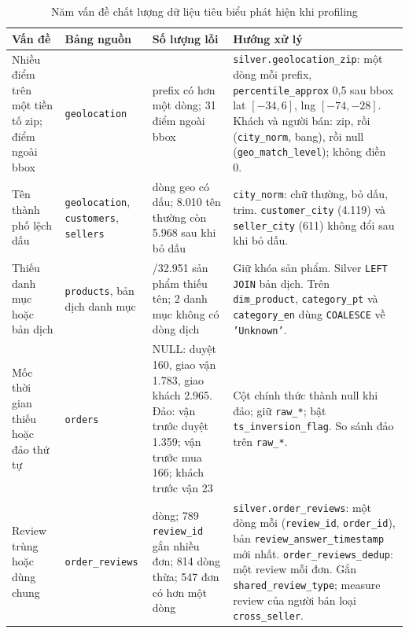 \documentclass[a4paper]{article}
\begin{document}
\begin{table}[htbp]
\centering
\footnotesize
\setlength{\tabcolsep}{3pt}
\renewcommand{\arraystretch}{1.08}
\caption{Năm vấn đề chất lượng dữ liệu tiêu biểu phát hiện khi profiling}
\label{tab:profiling_issues}
\begin{tabularx}{\textwidth}{@{}>{\raggedright\arraybackslash}p{2.5cm}>{\raggedright\arraybackslash}p{2.35cm}>{\raggedright\arraybackslash}p{3.15cm}>{\raggedright\arraybackslash}X@{}}
\toprule
\textbf{Vấn đề} & \textbf{Bảng nguồn} & \textbf{Số lượng lỗi} & \textbf{Hướng xử lý} \\
\midrule
Nhiều điểm trên một tiền tố zip; điểm ngoài bbox & \texttt{geolocation} & 17.972 prefix có hơn một dòng; 31 điểm ngoài bbox & \texttt{silver.geolocation\_zip}: một dòng mỗi prefix, \texttt{percentile\_approx} 0,5 sau bbox lat $[-34,6]$, lng $[-74,-28]$. Khách và người bán: zip, rồi (\texttt{city\_norm}, bang), rồi null (\texttt{geo\_match\_level}); không điền 0. \\
\addlinespace
Tên thành phố lệch dấu & \texttt{geolocation}, \texttt{customers}, \texttt{sellers} & 73.437 dòng geo có dấu; 8.010 tên thường còn 5.968 sau khi bỏ dấu & \texttt{city\_norm}: chữ thường, bỏ dấu, trim. \texttt{customer\_city} (4.119) và \texttt{seller\_city} (611) không đổi sau khi bỏ dấu. \\
\addlinespace
Thiếu danh mục hoặc bản dịch & \texttt{products}, bản dịch danh mục & 610/32.951 sản phẩm thiếu tên; 2 danh mục không có dòng dịch & Giữ khóa sản phẩm. Silver \texttt{LEFT JOIN} bản dịch. Trên \texttt{dim\_product}, \texttt{category\_pt} và \texttt{category\_en} dùng \texttt{COALESCE} về \texttt{'Unknown'}. \\
\addlinespace
Mốc thời gian thiếu hoặc đảo thứ tự & \texttt{orders} & NULL: duyệt 160, giao vận 1.783, giao khách 2.965. Đảo: vận trước duyệt 1.359; vận trước mua 166; khách trước vận 23 & Cột chính thức thành null khi đảo; giữ \texttt{raw\_*}; bật \texttt{ts\_inversion\_flag}. So sánh đảo trên \texttt{raw\_*}. \\
\addlinespace
Review trùng hoặc dùng chung & \texttt{order\_reviews} & 99.224 dòng; 789 \texttt{review\_id} gắn nhiều đơn; 814 dòng thừa; 547 đơn có hơn một dòng & \texttt{silver.order\_reviews}: một dòng mỗi (\texttt{review\_id}, \texttt{order\_id}), bản \texttt{review\_answer\_timestamp} mới nhất. \texttt{order\_reviews\_dedup}: một review mỗi đơn. Gắn \texttt{shared\_review\_type}; measure review của người bán loại \texttt{cross\_seller}. \\
\bottomrule
\end{tabularx}
\end{table}
\end{document}
